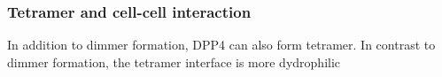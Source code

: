 \subsubsection{Tetramer and cell-cell interaction}

In addition to dimmer formation, DPP4 can also form tetramer. In contrast to dimmer formation, the tetramer interface is more dydrophilic 